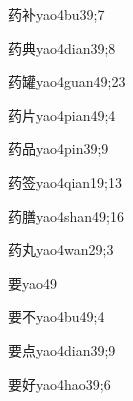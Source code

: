 \begin{verbete}{药补}{yao4bu3}{9;7}
\end{verbete}

\begin{verbete}{药典}{yao4dian3}{9;8}
\end{verbete}

\begin{verbete}{药罐}{yao4guan4}{9;23}
\end{verbete}

\begin{verbete}{药片}{yao4pian4}{9;4}
\end{verbete}

\begin{verbete}{药品}{yao4pin3}{9;9}
\end{verbete}

\begin{verbete}{药签}{yao4qian1}{9;13}
\end{verbete}

\begin{verbete}{药膳}{yao4shan4}{9;16}
\end{verbete}

\begin{verbete}{药丸}{yao4wan2}{9;3}
\end{verbete}

\begin{verbete}{要}{yao4}{9}
\end{verbete}

\begin{verbete}{要不}{yao4bu4}{9;4}
\end{verbete}

\begin{verbete}{要点}{yao4dian3}{9;9}
\end{verbete}

\begin{verbete}{要好}{yao4hao3}{9;6}
\end{verbete}

